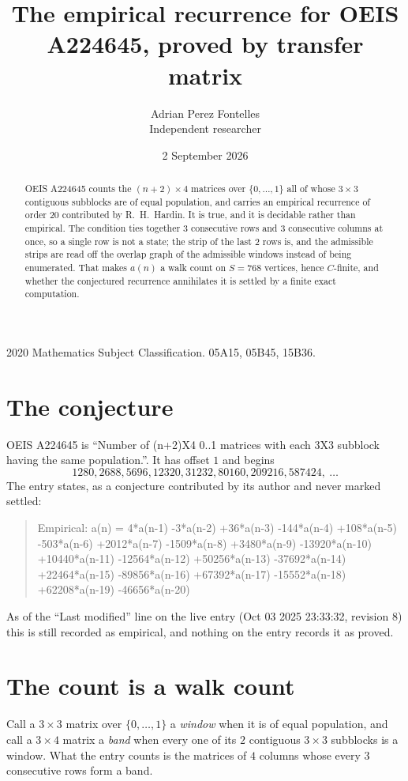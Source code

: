 \documentclass[11pt,a4paper]{article}
\title{The empirical recurrence for OEIS A224645, proved by transfer matrix}
\author{Adrian Perez Fontelles\\ \small Independent researcher}
\date{2 September 2026}
\theoremstyle{plain}
\theoremstyle{definition}
\begin{document}
\maketitle

\begin{abstract}
OEIS A224645 counts the $(n+2)\times4$ matrices over $\{0,\dots,1\}$ all of whose
$3\times3$ contiguous subblocks are of equal population, and carries an empirical recurrence of order
$20$ contributed by R.~H.~Hardin. It is true, and it is decidable rather than empirical.
The condition ties together $3$ consecutive rows and $3$ consecutive columns at once, so a
single row is not a state; the strip of the last $2$ rows is, and the admissible strips
are read off the overlap graph of the admissible windows instead of being enumerated. That
makes $a(n)$ a walk count on $S=768$ vertices, hence $C$-finite, and whether the conjectured
recurrence annihilates it is settled by a finite exact computation.
\end{abstract}

\noindent\small 2020 Mathematics Subject Classification. 05A15, 05B45, 15B36.\normalsize

\section{The conjecture}

OEIS A224645 is ``Number of (n+2)X4 0..1 matrices with each 3X3 subblock having the same population.''. It has offset $1$ and begins
\[
1280, 2688, 5696, 12320, 31232, 80160, 209216, 587424,\ \dots
\]
The entry states, as a conjecture contributed by its author and never marked settled:
\begin{quote}
Empirical: a(n) = 4*a(n-1) -3*a(n-2) +36*a(n-3) -144*a(n-4) +108*a(n-5) -503*a(n-6) +2012*a(n-7) -1509*a(n-8) +3480*a(n-9) -13920*a(n-10) +10440*a(n-11) -12564*a(n-12) +50256*a(n-13) -37692*a(n-14) +22464*a(n-15) -89856*a(n-16) +67392*a(n-17) -15552*a(n-18) +62208*a(n-19) -46656*a(n-20)
\end{quote}
As of the ``Last modified'' line on the live entry (Oct 03 2025 23:33:32, revision 8) this is still
recorded as empirical, and nothing on the entry records it as proved.

\section{The count is a walk count}

Call a $3\times3$ matrix over $\{0,\dots,1\}$ a \emph{window} when it is of equal population, and
call a $3\times4$ matrix a \emph{band} when every one of its $2$ contiguous
$3\times3$ subblocks is a window. What the entry counts is the matrices of $4$ columns
whose every $3$ consecutive rows form a band.
\end{document}
